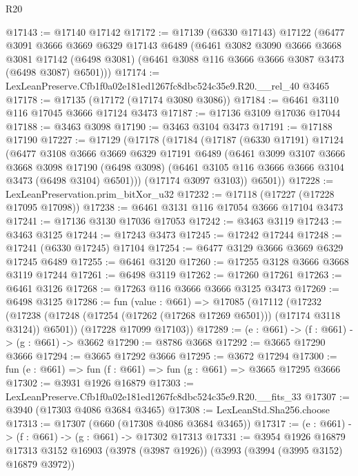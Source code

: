 \begin{lexlean}{R20}
\begin{coremodule}
@17143 := @17140 @17142
@17172 := @17139
    (@6330 @17143)
    @17122
    (@6477
      @3091
      @3666
      @3669
      @6329
      @17143
      @6489
      (@6461
        @3082
        @3090
        @3666
        @3668
        @3081
        @17142
        (@6498 @3081)
        (@6461 @3088 @116 @3666 @3666 @3087 @3473 (@6498 @3087) @6501)))
@17174 := LexLeanPreserve.Cfb1f0a02e181ed1267fc8dbc524c35e9.R20.__rel_40 @3465
@17178 := @17135 (@17172 (@17174 @3080 @3086))
@17184 := @6461 @3110 @116 @17045 @3666 @17124 @3473
@17187 := @17136 @3109 @17036 @17044
@17188 := @3463 @3098
@17190 := @3463 @3104 @3473
@17191 := @17188 @17190
@17227 := @17129
    (@17178
      (@17184
        (@17187
          (@6330 @17191)
          @17124
          (@6477
            @3108
            @3666
            @3669
            @6329
            @17191
            @6489
            (@6461
              @3099
              @3107
              @3666
              @3668
              @3098
              @17190
              (@6498 @3098)
              (@6461 @3105 @116 @3666 @3666 @3104 @3473 (@6498 @3104) @6501)))
          (@17174 @3097 @3103))
        @6501))
@17228 := LexLeanPreservation.prim_bitXor_u32
@17232 := @17118 (@17227 (@17228 @17095 @17098))
@17238 := @6461 @3131 @116 @17054 @3666 @17104 @3473
@17241 := @17136 @3130 @17036 @17053
@17242 := @3463 @3119
@17243 := @3463 @3125
@17244 := @17243 @3473
@17245 := @17242 @17244
@17248 := @17241 (@6330 @17245) @17104
@17254 := @6477 @3129 @3666 @3669 @6329 @17245 @6489
@17255 := @6461 @3120
@17260 := @17255 @3128 @3666 @3668 @3119 @17244
@17261 := @6498 @3119
@17262 := @17260 @17261
@17263 := @6461 @3126
@17268 := @17263 @116 @3666 @3666 @3125 @3473
@17269 := @6498 @3125
@17286 := fun (value : @661) =>
  @17085
    (@17112
      (@17232 (@17238 (@17248 (@17254 (@17262 (@17268 @17269 @6501))) (@17174 @3118 @3124)) @6501))
      (@17228 @17099 @17103))
@17289 := (e : @661) -> (f : @661) -> (g : @661) -> @3662
@17290 := @8786 @3668
@17292 := @3665 @17290 @3666
@17294 := @3665 @17292 @3666
@17295 := @3672 @17294
@17300 := fun (e : @661) => fun (f : @661) => fun (g : @661) => @3665 @17295 @3666
@17302 := @3931 @1926 @16879
@17303 := LexLeanPreserve.Cfb1f0a02e181ed1267fc8dbc524c35e9.R20.__fits_33
@17307 := @3940 (@17303 @4086 @3684 @3465)
@17308 := LexLeanStd.Sha256.choose
@17313 := @17307 (@660 (@17308 @4086 @3684 @3465))
@17317 := (e : @661) -> (f : @661) -> (g : @661) -> @17302 @17313
@17331 := @3954
    @1926
    @16879
    @17313
    @3152
    @16903
    (@3978 (@3987 @1926))
    (@3993 (@3994 (@3995 @3152) @16879 @3972))

\end{coremodule}
\end{lexlean}
